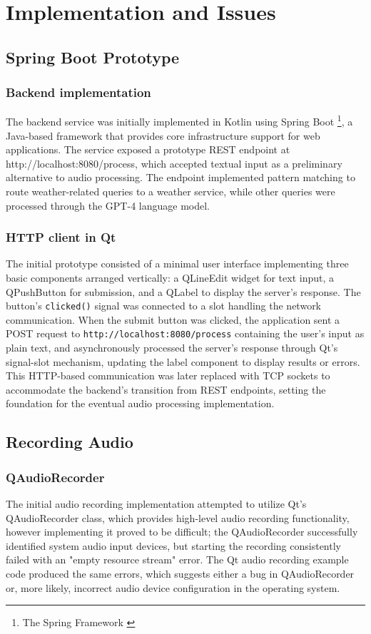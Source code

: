 \renewcommand*\chapterpagestyle{scrheadings}
\chapter{Implementation and Issues}

\section{Spring Boot Prototype}
\subsection{Backend implementation}
The backend service was initially implemented in Kotlin using Spring Boot \footnote{The Spring Framework \cite{spring}},
a Java-based framework that provides core infrastructure support for web applications.
The service exposed a prototype REST endpoint at http://localhost:8080/process,
which accepted textual input as a preliminary alternative to audio processing.
The endpoint implemented pattern matching to route weather-related queries to a weather service,
while other queries were processed through the GPT-4 language model.

\subsection{HTTP client in Qt}
The initial prototype consisted of a minimal user interface
implementing three basic components arranged vertically:
a QLineEdit widget for text input,
a QPushButton for submission,
and a QLabel to display the server's response.
The button's \texttt{clicked()} signal was connected to a slot
handling the network communication.
When the submit button was clicked, the application sent a POST request
to \texttt{http://localhost:8080/process} containing the user's input as plain text,
and asynchronously processed the server's response through Qt's signal-slot mechanism,
updating the label component to display results or errors.
This HTTP-based communication was later replaced with TCP sockets
to accommodate the backend's transition from REST endpoints,
setting the foundation for the eventual audio processing implementation.

\newpage
\section{Recording Audio}
\subsection{QAudioRecorder}
The initial audio recording implementation attempted to utilize Qt's QAudioRecorder class,
which provides high-level audio recording functionality, however implementing it proved to be difficult;
the QAudioRecorder successfully identified system audio input devices,
but starting the recording consistently failed with an "empty resource stream" error.
The Qt audio recording example code produced the same errors,
which suggests either a bug in QAudioRecorder or, more likely,
incorrect audio device configuration in the operating system.

